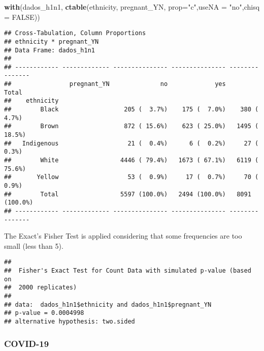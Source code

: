 \documentclass[
]{article}
\newenvironment{Shaded}{\begin{snugshade}}{\end{snugshade}}
\newcommand{\DataTypeTok}[1]{\textcolor[rgb]{0.13,0.29,0.53}{#1}}
\newcommand{\KeywordTok}[1]{\textcolor[rgb]{0.13,0.29,0.53}{\textbf{#1}}}
\newcommand{\NormalTok}[1]{#1}
\newcommand{\OperatorTok}[1]{\textcolor[rgb]{0.81,0.36,0.00}{\textbf{#1}}}
\newcommand{\OtherTok}[1]{\textcolor[rgb]{0.56,0.35,0.01}{#1}}
\newcommand{\StringTok}[1]{\textcolor[rgb]{0.31,0.60,0.02}{#1}}
\begin{document}
\begin{Shaded}
\begin{Highlighting}[]
\KeywordTok{with}\NormalTok{(dados_h1n1, }\KeywordTok{ctable}\NormalTok{(ethnicity, pregnant_YN, }\DataTypeTok{prop=}\StringTok{"c"}\NormalTok{,}\DataTypeTok{useNA =} \StringTok{"no"}\NormalTok{,}\DataTypeTok{chisq =} \OtherTok{FALSE}\NormalTok{))}
\end{Highlighting}
\end{Shaded}

\begin{verbatim}
## Cross-Tabulation, Column Proportions  
## ethnicity * pregnant_YN  
## Data Frame: dados_h1n1  
## 
## ------------ ------------- --------------- --------------- ---------------
##                pregnant_YN              no             yes           Total
##    ethnicity                                                              
##        Black                  205 (  3.7%)    175 (  7.0%)    380 (  4.7%)
##        Brown                  872 ( 15.6%)    623 ( 25.0%)   1495 ( 18.5%)
##   Indigenous                   21 (  0.4%)      6 (  0.2%)     27 (  0.3%)
##        White                 4446 ( 79.4%)   1673 ( 67.1%)   6119 ( 75.6%)
##       Yellow                   53 (  0.9%)     17 (  0.7%)     70 (  0.9%)
##        Total                 5597 (100.0%)   2494 (100.0%)   8091 (100.0%)
## ------------ ------------- --------------- --------------- ---------------
\end{verbatim}

The Exact's Fisher Test is applied considering that some frequencies are
too small (less than 5).

\begin{Shaded}
\end{Shaded}

\begin{verbatim}
## 
##  Fisher's Exact Test for Count Data with simulated p-value (based on
##  2000 replicates)
## 
## data:  dados_h1n1$ethnicity and dados_h1n1$pregnant_YN
## p-value = 0.0004998
## alternative hypothesis: two.sided
\end{verbatim}

\hypertarget{covid-19-2}{%
\subsubsection{COVID-19}\label{covid-19-2}}
\end{document}
